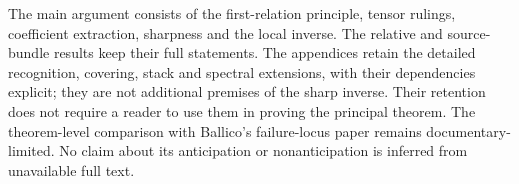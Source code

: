 The main argument consists of the first-relation principle, tensor
rulings, coefficient extraction, sharpness and the local inverse. The
relative and source-bundle results keep their full statements.
The appendices retain the detailed recognition, covering, stack and
spectral extensions, with their dependencies explicit; they are not
additional premises of the sharp inverse. Their retention does not
require a reader to use them in proving the principal theorem.
The theorem-level comparison with Ballico's failure-locus paper
\cite{Ballico93} remains documentary-limited. No claim about its
anticipation or nonanticipation is inferred from unavailable full text.

